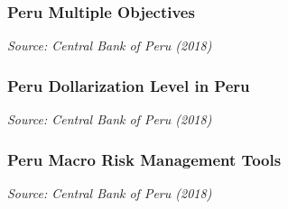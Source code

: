 \documentclass{beamer}
\begin{document}
\begin{frame}
\frametitle{Peru Multiple Objectives}
\medskip
\emph{Source: Central Bank of Peru (2018)}
\end{frame}


\begin{frame}
\frametitle{Peru Dollarization Level in Peru}
\medskip
\emph{Source: Central Bank of Peru (2018)}
\end{frame}


\begin{frame}
\frametitle{Peru Macro Risk Management Tools}
\medskip
\emph{Source: Central Bank of Peru (2018)}
\end{frame}
\end{document}

